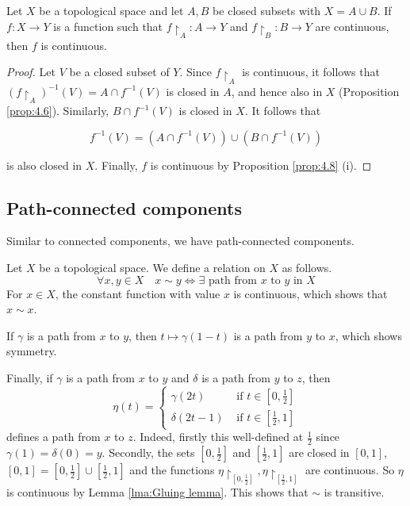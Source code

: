 \documentclass[a4paper,11pt]{article}
\begin{document}
\begin{lemma}\label{lma:Gluing lemma}
    Let $X$ be a topological space and let $A, B$ be closed subsets with $X=A \cup B$. If $f: X \rightarrow Y$ is a function such that $f\restriction_{A}: A \rightarrow Y$ and $f\restriction_{B}: B \rightarrow Y$ are continuous, then $f$ is continuous.
\end{lemma}

\begin{proof}
    Let $V$ be a closed subset of $Y$. Since $f\restriction_{A}$ is continuous, it follows that $\left(f\restriction_{A}\right)^{-1}(V)=A \cap f^{-1}(V)$ is closed in $A$, and hence also in $X$ (Proposition \ref{prop:4.6}). Similarly, $B \cap f^{-1}(V)$ is closed in $X$. It follows that

$$
f^{-1}(V)=\left(A \cap f^{-1}(V)\right) \cup\left(B \cap f^{-1}(V)\right)
$$

is also closed in $X$. Finally, $f$ is continuous by Proposition \ref{prop:4.8} (i).
\end{proof}

\subsection{Path-connected components}
Similar to connected components, we have path-connected components.

Let $X$ be a topological space. We define a relation on $X$ as follows.
$$
\forall x, y \in X \quad x \sim y \Longleftrightarrow \exists \text { path from } x \text { to } y \text { in } X
$$
For $x \in X$, the constant function with value $x$ is continuous, which shows that $x \sim x$. 

If $\gamma$ is a path from $x$ to $y$, then $t \mapsto \gamma(1-t)$ is a path from $y$ to $x$, which shows symmetry. 

Finally, if $\gamma$ is a path from $x$ to $y$ and $\delta$ is a path from $y$ to $z$, then
$$
\eta(t)= \begin{cases}\gamma(2 t) & \text { if } t \in\left[0, \frac{1}{2}\right] \\ \delta(2 t-1) & \text { if } t \in\left[\frac{1}{2}, 1\right]\end{cases}
$$
defines a path from $x$ to $z$. Indeed, firstly this well-defined at $\frac{1}{2}$ since
$\gamma(1)=\delta(0)=y$. Secondly, the sets $\left[0, \frac{1}{2}\right]$ and $\left[\frac{1}{2}, 1\right]$ are closed in $[0,1]$, $[0,1]=\left[0, \frac{1}{2}\right] \cup\left[\frac{1}{2}, 1\right]$ and the functions $\eta\restriction_{\left[0, \frac{1}{2}\right]}, \eta \restriction_{\left[\frac{1}{2}, 1\right]}$ are continuous. So $\eta$ is continuous by Lemma \ref{lma:Gluing lemma}. This shows that $\sim$ is transitive.
\end{document}
